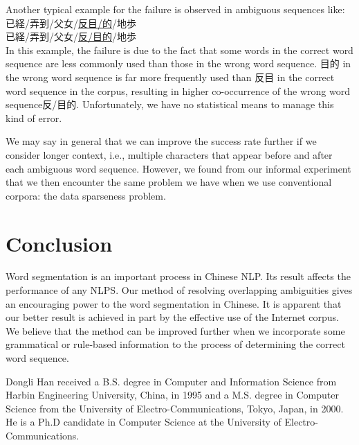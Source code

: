 {Another typical example for the failure is observed in ambiguous sequences like:\\
\hspace*{3zw}       {\small 已経}/{\small 弄到}/{\small 父女}/\underline{{\small 反目}/{\small 的}}/{\small 地歩}\\
\hspace*{3zw}       {\small 已経}/{\small 弄到}/{\small 父女}/\underline{{\small 反}/{\small 目的}}/{\small 地歩}\\
In this example, the failure is due to the fact that some words in the correct word sequence are less commonly
used than those in the wrong word sequence. {\small 目的} in the wrong word sequence is far more frequently used
than {\small 反目} in the correct word sequence in the corpus, resulting in higher co-occurrence of the wrong word
sequence{\small 反}/{\small 目的}. Unfortunately, we have no statistical means to manage this kind of error.

We may say in general that we can improve the success rate further if we consider longer context, i.e., multiple characters that appear before and after each ambiguous word sequence. However, we found from our informal experiment that we then encounter the same problem we have when we use conventional corpora: the data sparseness problem.

\section{Conclusion}
\label{conclude}

Word segmentation is an important process in Chinese NLP. Its result affects the performance of any NLPS. Our method of resolving overlapping ambiguities gives an encouraging power to the word segmentation in Chinese. It is apparent that our better result is achieved in part by the effective use of the Internet corpus. We believe that the method can be improved further when we incorporate some grammatical or rule-based information to the process of determining the correct word sequence. 




\begin{biography}

\biotitle{}

{
Dongli Han received a B.S. degree in Computer and Information Science 
from Harbin Engineering University, China, in 1995 and a M.S. degree in Computer Science from the University of Electro-Communications,
Tokyo, Japan, in 2000. He is a Ph.D candidate in Computer Science at the University of
Electro-Communications.
}


\end{biography}}
